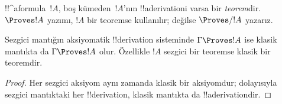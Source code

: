 \documentclass[../../../include/open-logic-section]{subfiles}
\begin{document}
\begin{defn}[Teoremler]
!!^a{formula}~$!A$, boş kümeden~$!A$'nın !!a{derivation}{}i varsa bir
\emph{teorem}dir. $\Proves !A$ yazımı, $!A$ bir teoremse kullanılır; değilse
$\Proves/ !A$ yazarız.
\end{defn}

\begin{prop}
  Sezgici mantığın aksiyomatik !!{derivation} sisteminde $\Gamma \Proves !A$
  ise klasik mantıkta da $\Gamma \Proves !A$ olur. Özellikle $!A$ sezgici bir
  teoremse klasik bir teoremdir.
\end{prop}

\begin{proof}
  Her sezgici aksiyom aynı zamanda klasik bir aksiyomdur; dolayısıyla sezgici
  mantıktaki her !!{derivation}, klasik mantıkta da !!a{derivation}{}dir.
\end{proof}
\end{document}
